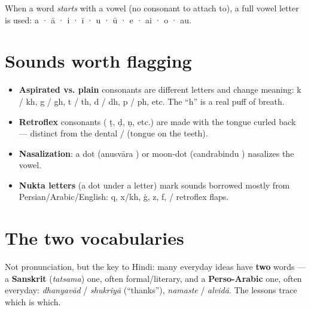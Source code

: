 When a word \emph{starts} with a vowel (no consonant to attach to), a full vowel letter is used: \textbf{} a · \textbf{} ā · \textbf{} i · \textbf{} ī · \textbf{} u · \textbf{} ū · \textbf{} e · \textbf{} ai · \textbf{} o · \textbf{} au.

\section*{Sounds worth flagging}

\begin{itemize}
\raggedright
\setlength{\itemsep}{0.35em}
  \item \textbf{Aspirated vs. plain} consonants are different letters and change meaning:  k /  kh,  g /  gh,  t /  th,  d /  dh,  p /  ph, etc. The \textquotedblleft{}h\textquotedblright{} is a real puff of breath.
  \item \textbf{Retroflex} consonants ( ṭ,  ḍ,  ṇ, etc.) are made with the tongue curled back — distinct from the dental / (tongue on the teeth).
  \item \textbf{Nasalization}: a dot (anusvāra ) or moon-dot (candrabindu ) nasalizes the vowel.
  \item \textbf{Nukta letters} (a dot under a letter) mark sounds borrowed mostly from Persian/Arabic/English:  q,  x/kh,  ġ,  z,  f, / retroflex flaps.
\end{itemize}

\section*{The two vocabularies}

Not pronunciation, but the key to Hindi: many everyday ideas have \textbf{two} words — a \textbf{Sanskrit} (\emph{tatsama}) one, often formal/literary, and a \textbf{Perso-Arabic} one, often everyday: \emph{dhanyavād} / \emph{shukriyā} (\textquotedblleft{}thanks\textquotedblright{}), \emph{namaste} / \emph{alvidā}. The lessons trace which is which.

